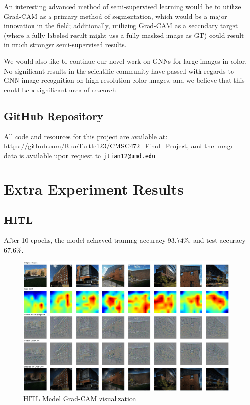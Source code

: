 \documentclass{article}
\begin{document}
An interesting advanced method of semi-supervised learning would be to utilize Grad-CAM as a primary method of segmentation, which would be a major innovation in the field; additionally, utilizing Grad-CAM as a secondary target (where a fully labeled result might use a fully masked image as GT) could result in much stronger semi-supervised results.

We would also like to continue our novel work on GNNs for large images in color. No significant results in the scientific community have passed with regards to GNN image recognition on high resolution color images, and we believe that this could be a significant area of research.

\subsection*{GitHub Repository}

All code and resources for this project are available at: \url{https://github.com/BlueTurtle123/CMSC472_Final_Project}, and the image data is available upon request to \verb*|jtian12@umd.edu|

\newpage 
\appendix

\section{Extra Experiment Results}
\label{experiment_results}

\subsection{HITL}

After 10 epochs, the model achieved training accuracy $93.74\%$, and test accuracy $67.6\%$. 

\begin{figure}[H]
    \centering
    \includegraphics[width=0.8\linewidth]{hitl.png}
    \caption{HITL Model Grad-CAM visualization}
    \label{fig:hitl_results}
\end{figure}
\end{document}
